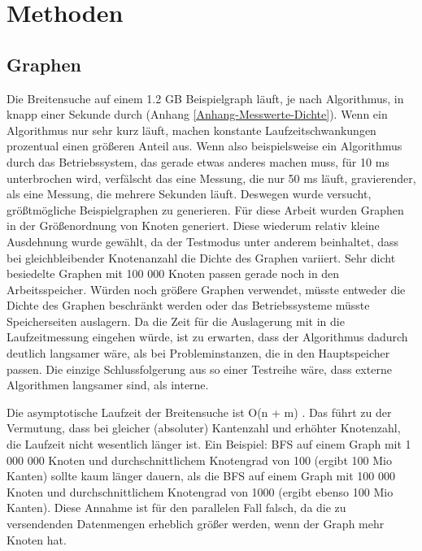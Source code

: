 
\chapter{Methoden} %
\label{cha:methoden}

\section{Graphen} %
\label{sec:graphen}
Die Breitensuche auf einem 1.2 GB Beispielgraph läuft, je nach Algorithmus, in knapp einer Sekunde durch (Anhang \ref{Anhang-Messwerte-Dichte}). Wenn ein Algorithmus nur sehr kurz läuft, machen konstante Laufzeitschwankungen prozentual einen größeren Anteil aus. Wenn also beispielsweise ein Algorithmus durch das Betriebssystem, das gerade etwas anderes machen muss, für 10 ms unterbrochen wird, verfälscht das eine Messung, die nur 50 ms läuft, gravierender, als eine Messung, die mehrere Sekunden läuft. Deswegen wurde versucht, größtmögliche Beispielgraphen zu generieren. Für diese Arbeit wurden Graphen in der Größenordnung von  Knoten generiert. Diese wiederum relativ kleine Ausdehnung wurde gewählt, da der Testmodus unter anderem beinhaltet, dass bei gleichbleibender Knotenanzahl die Dichte des Graphen variiert. Sehr dicht besiedelte Graphen mit 100 000 Knoten passen gerade noch in den Arbeitsspeicher. Würden noch größere Graphen verwendet, müsste entweder die Dichte des Graphen beschränkt werden oder das Betriebssysteme müsste Speicherseiten auslagern. Da die Zeit für die Auslagerung mit in die Laufzeitmessung eingehen würde, ist zu erwarten, dass der Algorithmus dadurch deutlich langsamer wäre, als bei Probleminstanzen, die in den Hauptspeicher passen. Die einzige Schlussfolgerung aus so einer Testreihe wäre, dass externe Algorithmen langsamer sind, als interne. 

Die asymptotische Laufzeit der Breitensuche ist O(n + m) \cite{SWB-283374373}. Das führt zu der Vermutung, dass bei gleicher (absoluter) Kantenzahl und erhöhter Knotenzahl, die Laufzeit nicht wesentlich länger ist. Ein Beispiel: BFS auf einem Graph mit 1 000 000 Knoten und durchschnittlichem Knotengrad von 100 (ergibt 100 Mio Kanten) sollte kaum länger dauern, als die BFS auf einem Graph mit 100 000 Knoten und durchschnittlichem Knotengrad von 1000 (ergibt ebenso 100 Mio Kanten). Diese Annahme ist für den parallelen Fall falsch, da die zu versendenden Datenmengen erheblich größer werden, wenn der Graph mehr Knoten hat.

